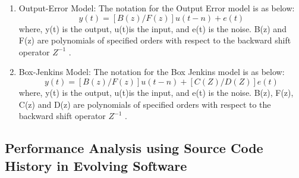 \documentclass[article,type=msc,colorback,12pt,accentcolor=tud7b]{tudthesis}
\begin{document}
\begin{enumerate}
	\item{Output-Error Model:} 
		The notation for the Output Error model is as below: $$ y(t) = [B(z)/F(z)] u(t-n) + e(t) $$ where, y(t) is the output, u(t)is the input, and e(t) is the noise. B(z) and F(z) are polynomials of specified orders with respect to the backward shift operator $Z^{-1}$ \cite{oe}.
	
	\item{Box-Jenkins Model:} 	
		 The notation for the Box Jenkins model is as below: $$ y(t) = [B(z)/F(z)] u(t-n) + [C(Z)/D(Z)] e(t) $$ where, y(t) is the output, u(t)is the input, and e(t) is the noise. B(z), F(z), C(z) and D(z) are polynomials of specified orders with respect to the backward shift operator $Z^{-1}$ \cite{bj}.
		 
	\end{enumerate}
	
	\subsection{Performance Analysis using Source Code History in Evolving Software}
	
\end{document}
